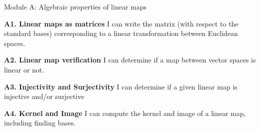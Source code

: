 
\begin{module}{Module A: Algebraic properties of linear maps}

\begin{moduleStandards}
  \item \textbf{A1. Linear maps as matrices}
         I can write the matrix (with respect to the standard bases) corresponding to a linear transformation between Euclidean spaces.
  \item \textbf{A2. Linear map verification}
        I can determine if a map between vector spaces is linear or not.
  \item \textbf{A3. Injectivity and Surjectivity}
        I can determine if a given linear map is injective and/or surjective
  \item \textbf{A4. Kernel and Image}
        I can compute the kernel and image of a linear map, including finding bases.
\end{moduleStandards}







\end{module}